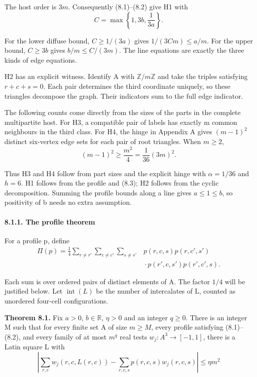 \documentclass[english,11pt,a4paper]{article}
\begin{document}
The host order is \(3m\). Consequently (8.1)--(8.2) give H1 with
\[C=\max\left\{1,3b,\frac1{3a}\right\}.                             \tag{8.3}\]

For the lower diffuse bound, \(C\geq1/(3a)\) gives \(1/(3Cm)\leq a/m\). For the upper bound, \(C\geq3b\) gives \(b/m\leq C/(3m)\). The line equations are exactly the three kinds of edge equations.

H2 has an explicit witness. Identify A with \(\mathbb Z/m\mathbb Z\) and take the triples satisfying \(r+c+s=0\). Each pair determines the third coordinate uniquely, so these triangles decompose the graph. Their indicators sum to the full edge indicator.

The following counts come directly from the sizes of the parts in the complete multipartite host. For H3, a compatible pair of labels has exactly m common neighbours in the third class. For H4, the hinge in Appendix A gives \((m-1)^2\) distinct six-vertex edge sets for each pair of root triangles. When \(m\geq2\),
\[(m-1)^2\geq\frac{m^2}{4}
=\frac1{36}(3m)^2.                                                 \tag{8.4}\]

Thus H3 and H4 follow from part sizes and the explicit hinge with \(\alpha=1/36\) and \(h=6\). H1 follows from the profile and (8.3); H2 follows from the cyclic decomposition. Summing the profile bounds along a line gives \(a\leq1\leq b\), so positivity of b needs no extra assumption.

\paragraph{8.1.1. The profile theorem}\label{the-profile-theorem}

For a profile p, define
\[\begin{aligned}
\Pi(p)=\frac14
\sum_{r\ne r'}\sum_{c\ne c'}\sum_{s\ne s'}
&p(r,c,s)p(r,c',s')\\[-2pt]
&{}\cdot p(r',c,s')p(r',c',s).
\end{aligned}                                                       \tag{8.5}\]

Each sum is over ordered pairs of distinct elements of A. The factor \(1/4\) will be justified below. Let \(\operatorname{int}(L)\) be the number of intercalates of L, counted as unordered four-cell configurations.

\textbf{Theorem 8.1.} Fix \(a>0\), \(b\in\mathbb R\), \(\eta>0\) and an integer \(q\geq0\). There is an integer M such that for every finite set A of size \(m\geq M\), every profile satisfying (8.1)--(8.2), and every family of at most \(m^q\) real tests \(w_j:A^3\to[-1,1]\), there is a Latin square L with
\[\left|\sum_{r,c}w_j(r,c,L(r,c))-
\sum_{r,c,s}p(r,c,s)w_j(r,c,s)\right|\leq\eta m^2                  \tag{8.6}\]
\end{document}
